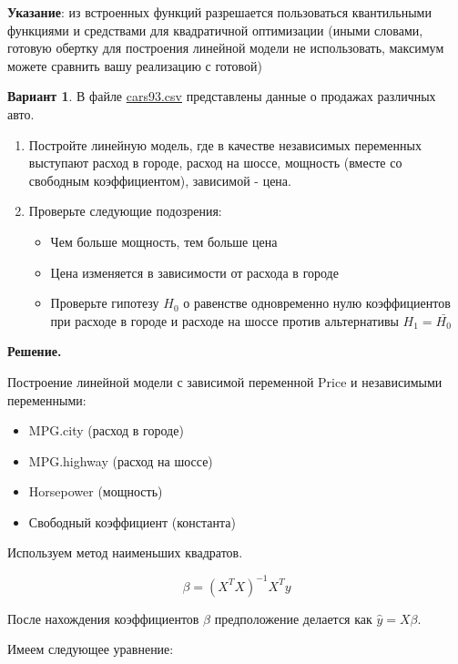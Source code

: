 \documentclass[12pt]{article}
\begin{document}
	\textbf{Указание}: из встроенных функций разрешается пользоваться квантильными функциями и средствами для квадратичной оптимизации (иными словами, готовую обертку для построения линейной модели не использовать, максимум можете сравнить вашу реализацию с готовой)
	
	\textbf{Вариант 1}.
	В файле \href{https://drive.google.com/file/d/1vv2jGNp6EO8HHRoscDRQU90faR3j8iTN/view}{cars93.csv} представлены данные о продажах различных авто.
	
	\begin{enumerate}
		\item Постройте линейную модель, где в качестве независимых переменных выступают расход в городе, расход на шоссе, мощность (вместе со свободным коэффициентом), зависимой - цена.
		
		\item Проверьте следующие подозрения:
		\begin{itemize}
			\item Чем больше мощность, тем больше цена
			
			\item Цена изменяется в зависимости от расхода в городе
			
			\item Проверьте гипотезу $H_0$ о равенстве одновременно нулю коэффициентов при расходе в городе и расходе на шоссе против альтернативы $H_1 = \bar{H_0}$
		\end{itemize}
	\end{enumerate}
	
	\textbf{Решение.}
	
	Построение линейной модели с зависимой переменной Price и независимыми переменными:
	
	\begin{itemize}
		\item MPG.city (расход в городе)
		\item MPG.highway (расход на шоссе)
		\item Horsepower (мощность)
		\item Свободный коэффициент (константа)
	\end{itemize}
	\vspace*{1em}
	
	Используем метод наименьших квадратов.
	
	$$ \beta = (X^T X)^{-1} X^T y $$
	
	После нахождения коэффициентов $ \beta $ предположение делается как $ \hat{y} = X \beta $.
	
	Имеем следующее уравнение:
	
\end{document}
